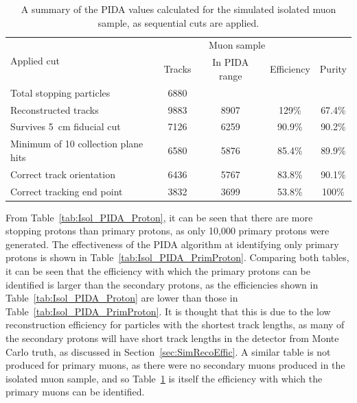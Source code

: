 \begin{table}
  \caption[A summary of the PIDA values calculated for the simulated isolated muon sample, as sequential cuts are applied]
          {A summary of the PIDA values calculated for the simulated isolated muon sample, as sequential cuts are applied.}
  \centering
  \label{tab:Isol_PIDA_Muon}
  \begin{tabular}{l c c c c}
    \toprule
    \multirow{2}{*}{Applied cut} & \multicolumn{3}{c}{Muon sample} \\ 
    \cmidrule{2-5}
      & Tracks & In PIDA range & Efficiency & Purity \\ 
    \midrule
      Total stopping particles            & 6880 &      &        & \\

      Reconstructed tracks                & 9883 & 8907 & 129\%  & 67.4\% \\

      Survives 5~cm fiducial cut          & 7126 & 6259 & 90.9\% & 90.2\% \\

      Minimum of 10 collection plane hits & 6580 & 5876 & 85.4\% & 89.9\% \\

      Correct track orientation           & 6436 & 5767 & 83.8\% & 90.1\% \\

      Correct tracking end point          & 3832 & 3699 & 53.8\% & 100\%  \\
    \bottomrule
  \end{tabular}
\end{table}

From Table~\ref{tab:Isol_PIDA_Proton}, it can be seen that there are more stopping protons than primary protons, as only 10,000 primary protons were generated. The effectiveness of the PIDA algorithm at identifying only primary protons is shown in Table~\ref{tab:Isol_PIDA_PrimProton}. Comparing both tables, it can be seen that the efficiency with which the primary protons can be identified is larger than the secondary protons, as the efficiencies shown in Table~\ref{tab:Isol_PIDA_Proton} are lower than those in Table~\ref{tab:Isol_PIDA_PrimProton}. It is thought that this is due to the low reconstruction efficiency for particles with the shortest track lengths, as many of the secondary protons will have short track lengths in the detector from Monte Carlo truth, as discussed in Section~\ref{sec:SimRecoEffic}. A similar table is not produced for primary muons, as there were no secondary muons produced in the isolated muon sample, and so Table~\ref{tab:Isol_PIDA_Muon} is itself the efficiency with which the primary muons can be identified. \\ 


